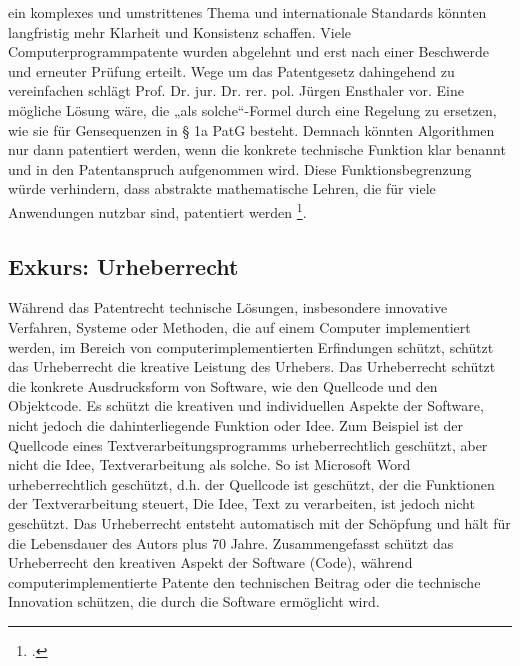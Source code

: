 ein komplexes und umstrittenes Thema 
und internationale Standards könnten 
langfristig mehr Klarheit und Konsistenz schaffen.
Viele Computerprogrammpatente wurden abgelehnt und erst nach 
einer Beschwerde und erneuter Prüfung erteilt.
Wege um das Patentgesetz dahingehend zu vereinfachen schlägt 
Prof. Dr. jur. Dr. rer. pol. Jürgen Ensthaler 
vor. 
Eine mögliche Lösung wäre, die „als solche“-Formel durch eine Regelung zu ersetzen, 
wie sie für Gensequenzen in § 1a PatG besteht. 
Demnach könnten Algorithmen nur dann patentiert werden, 
wenn die konkrete technische Funktion klar benannt 
und in den Patentanspruch aufgenommen wird. 
Diese Funktionsbegrenzung würde verhindern, 
dass abstrakte mathematische Lehren, 
die für viele Anwendungen nutzbar sind, patentiert werden 
\footcite{ensthalerEnsthalerBegrenzungPatentierung2013}. 
\subsection{Exkurs: Urheberrecht\label{sec:urh}}
Während das Patentrecht technische Lösungen, 
insbesondere innovative Verfahren, 
Systeme oder Methoden, die auf einem Computer implementiert werden,
im Bereich von computerimplementierten Erfindungen
schützt, schützt das Urheberrecht die kreative Leistung des Urhebers.
Das Urheberrecht schützt die konkrete Ausdrucksform von Software, 
wie den Quellcode und den Objektcode. 
Es schützt die kreativen und individuellen Aspekte der Software, 
nicht jedoch die dahinterliegende Funktion oder Idee.
Zum Beispiel ist
der Quellcode eines Textverarbeitungsprogramms
urheberrechtlich geschützt, 
aber nicht die Idee, Textverarbeitung als solche.
So ist Microsoft Word urheberrechtlich geschützt, d.h.
der Quellcode ist geschützt,
der die Funktionen der Textverarbeitung steuert,
Die Idee, Text zu verarbeiten, ist jedoch nicht geschützt.
Das Urheberrecht entsteht automatisch mit der Schöpfung 
und hält für die Lebensdauer des Autors plus 70 Jahre.
Zusammengefasst schützt das Urheberrecht den kreativen Aspekt der Software (Code), 
während computerimplementierte Patente 
den technischen Beitrag oder die technische Innovation schützen, 
die durch die Software ermöglicht wird.

